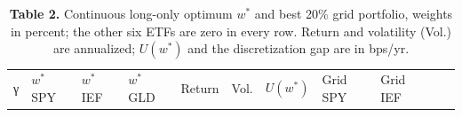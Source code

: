 \documentclass[
  11pt]{article}
\begin{document}
\begin{table}[htbp]
\centering\small
\caption{\textbf{Table 2.} Continuous long-only optimum \(w^*\) and best
20\% grid portfolio, weights in percent; the other six ETFs are zero in
every row. Return and volatility (Vol.) are annualized; \(U(w^*)\) and
the discretization gap are in bps/yr.}
\begin{tabular}{@{}
  >{\raggedright\arraybackslash}p{}
  >{\raggedleft\arraybackslash}p{}
  >{\raggedleft\arraybackslash}p{}
  >{\raggedleft\arraybackslash}p{}
  >{\raggedleft\arraybackslash}p{}
  >{\raggedleft\arraybackslash}p{}
  >{\raggedleft\arraybackslash}p{}
  >{\raggedleft\arraybackslash}p{}
  >{\raggedleft\arraybackslash}p{}
  >{\raggedleft\arraybackslash}p{}
  >{\raggedleft\arraybackslash}p{}@{}}
\toprule\noalign{}
\begin{minipage}[b]{\linewidth}\raggedright
γ
\end{minipage} & \begin{minipage}[b]{\linewidth}\raggedleft
\(w^*\) SPY
\end{minipage} & \begin{minipage}[b]{\linewidth}\raggedleft
\(w^*\) IEF
\end{minipage} & \begin{minipage}[b]{\linewidth}\raggedleft
\(w^*\) GLD
\end{minipage} & \begin{minipage}[b]{\linewidth}\raggedleft
Return
\end{minipage} & \begin{minipage}[b]{\linewidth}\raggedleft
Vol.
\end{minipage} & \begin{minipage}[b]{\linewidth}\raggedleft
\(U(w^*)\)
\end{minipage} & \begin{minipage}[b]{\linewidth}\raggedleft
Grid SPY
\end{minipage} & \begin{minipage}[b]{\linewidth}\raggedleft
Grid IEF
\end{minipage} & \begin{minipage}[b]{\linewidth}\raggedleft

\end{minipage}
\end{tabular}
\end{table}
\end{document}
